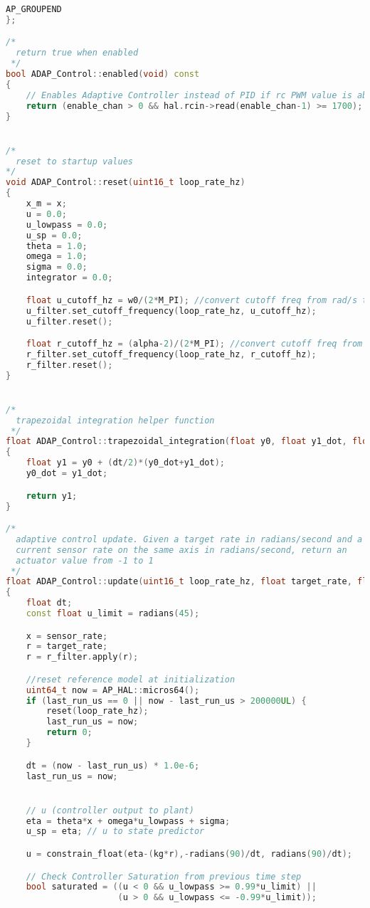 \begin{lstlisting}[language=c++]
    AP_GROUPEND
};

/*
  return true when enabled
 */
bool ADAP_Control::enabled(void) const
{
    // Enables Adaptive Controller instead of PID if rc PWM value is above 1700 milli seconds
    return (enable_chan > 0 && hal.rcin->read(enable_chan-1) >= 1700);
}


/*
  reset to startup values
*/
void ADAP_Control::reset(uint16_t loop_rate_hz)
{
    x_m = x;
    u = 0.0;
    u_lowpass = 0.0;
    u_sp = 0.0;
    theta = 1.0;
    omega = 1.0;
    sigma = 0.0;
    integrator = 0.0;

    float u_cutoff_hz = w0/(2*M_PI); //convert cutoff freq from rad/s to hz
    u_filter.set_cutoff_frequency(loop_rate_hz, u_cutoff_hz);
    u_filter.reset();

    float r_cutoff_hz = (alpha-2)/(2*M_PI); //convert cutoff freq from rad/s to hz
    r_filter.set_cutoff_frequency(loop_rate_hz, r_cutoff_hz);
    r_filter.reset();
}


/*
  trapezoidal integration helper function
 */
float ADAP_Control::trapezoidal_integration(float y0, float y1_dot, float dt, float &y0_dot)
{
    float y1 = y0 + (dt/2)*(y0_dot+y1_dot);
    y0_dot = y1_dot;

    return y1;
}

/*
  adaptive control update. Given a target rate in radians/second and a
  current sensor rate on the same axis in radians/second, return an
  actuator value from -1 to 1
 */
float ADAP_Control::update(uint16_t loop_rate_hz, float target_rate, float sensor_rate, float scaler, float aspeed)
{
    float dt;
    const float u_limit = radians(45);

    x = sensor_rate;
    r = target_rate;
    r = r_filter.apply(r);    

    //reset reference model at initialization
    uint64_t now = AP_HAL::micros64();
    if (last_run_us == 0 || now - last_run_us > 200000UL) {
        reset(loop_rate_hz);
        last_run_us = now;
        return 0;
    }

    dt = (now - last_run_us) * 1.0e-6;
    last_run_us = now;


    // u (controller output to plant)
    eta = theta*x + omega*u_lowpass + sigma;
    u_sp = eta; // u to state predictor

    u = constrain_float(eta-(kg*r),-radians(90)/dt, radians(90)/dt);

    // Check Controller Saturation from previous time step
    bool saturated = ((u < 0 && u_lowpass >= 0.99*u_limit) ||
                      (u > 0 && u_lowpass <= -0.99*u_limit));


\end{lstlisting}
